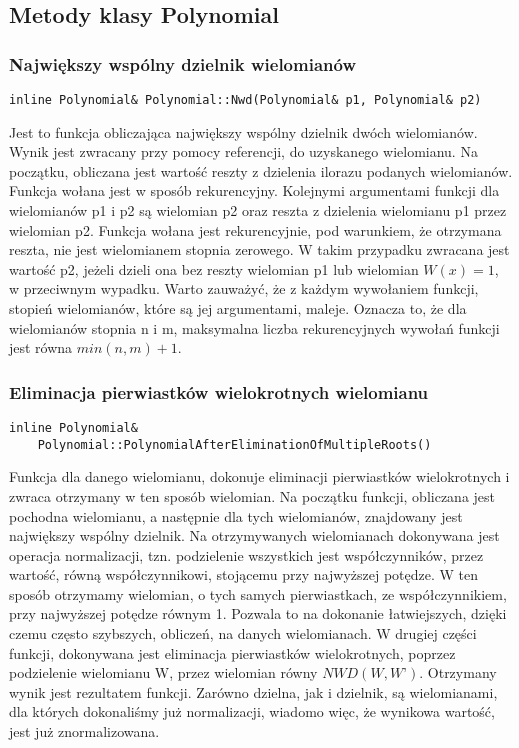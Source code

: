 \documentclass[twoside,a4paper]{book}
\begin{document}
\subsection{Metody klasy Polynomial}

\subsubsection{Największy wspólny dzielnik wielomianów}
\begin{lstlisting}
inline Polynomial& Polynomial::Nwd(Polynomial& p1, Polynomial& p2)
\end{lstlisting}

Jest to funkcja obliczająca największy wspólny dzielnik dwóch wielomianów. Wynik jest zwracany przy pomocy referencji, do uzyskanego wielomianu. Na początku, obliczana jest wartość reszty z dzielenia ilorazu podanych wielomianów. Funkcja wołana jest w sposób rekurencyjny. Kolejnymi argumentami funkcji dla wielomianów p1 i p2 są wielomian p2 oraz reszta z dzielenia wielomianu p1 przez wielomian p2. Funkcja wołana jest rekurencyjnie, pod warunkiem, że otrzymana reszta, nie jest wielomianem stopnia zerowego. W takim przypadku zwracana jest wartość p2, jeżeli dzieli ona bez reszty wielomian p1 lub wielomian $W(x)=1$, w przeciwnym wypadku. Warto zauważyć, że z każdym wywołaniem funkcji, stopień wielomianów, które są jej argumentami, maleje. Oznacza to, że dla wielomianów stopnia n i m, maksymalna liczba rekurencyjnych wywołań funkcji jest równa $min(n,m)+1$.
\\

\subsubsection{Eliminacja pierwiastków wielokrotnych wielomianu}
\begin{lstlisting}
inline Polynomial&
	Polynomial::PolynomialAfterEliminationOfMultipleRoots()
\end{lstlisting}

Funkcja dla danego wielomianu, dokonuje eliminacji pierwiastków wielokrotnych i zwraca otrzymany w ten sposób wielomian. Na początku funkcji, obliczana jest pochodna wielomianu, a następnie dla tych wielomianów, znajdowany jest największy wspólny dzielnik. Na otrzymywanych wielomianach dokonywana jest operacja normalizacji, tzn. podzielenie wszystkich jest współczynników, przez wartość, równą współczynnikowi, stojącemu przy najwyższej potędze. W ten sposób otrzymamy wielomian, o tych samych pierwiastkach, ze współczynnikiem, przy najwyższej potędze równym 1. Pozwala to na dokonanie łatwiejszych, dzięki czemu często szybszych, obliczeń, na danych wielomianach. W drugiej części funkcji, dokonywana jest eliminacja pierwiastków wielokrotnych, poprzez podzielenie wielomianu W, przez wielomian równy $NWD(W, W’)$. Otrzymany wynik jest rezultatem funkcji. Zarówno dzielna, jak i dzielnik, są wielomianami, dla których dokonaliśmy już normalizacji, wiadomo więc, że wynikowa wartość, jest już znormalizowana.
\\
\end{document}
